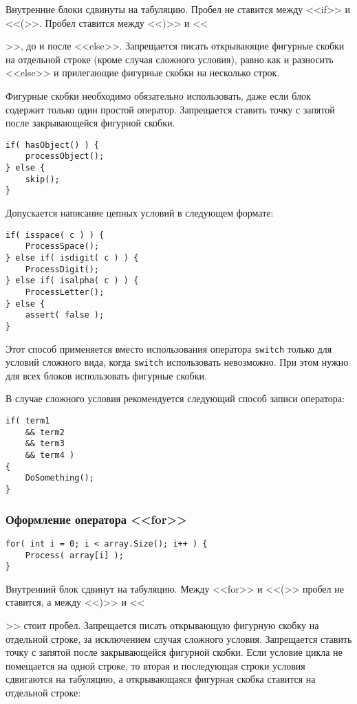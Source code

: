 Внутренние блоки сдвинуты на табуляцию. Пробел не ставится между <<if>> и <<(>>. Пробел ставится между <<)>> и <<{>>, до и после <<else>>. Запрещается писать открывающие фигурные скобки на отдельной строке (кроме случая сложного условия), равно как и разносить <<else>> и прилегающие фигурные скобки на несколько строк.
	
Фигурные скобки необходимо обязательно использовать, даже если блок содержит только один простой оператор. Запрещается ставить точку с запятой после закрывающейся фигурной скобки.

\begin{lstlisting}[frame=single]
if( hasObject() ) {
    processObject();
} else {
    skip();
}
\end{lstlisting}

Допускается написание цепных условий в следующем формате:

\begin{lstlisting}[frame=single]
if( isspace( c ) ) {
    ProcessSpace();
} else if( isdigit( c ) ) {
    ProcessDigit();
} else if( isalpha( c ) ) {
    ProcessLetter();
} else {
    assert( false );
}
\end{lstlisting}

Этот способ применяется  вместо использования оператора \lstinline|switch| только для условий сложного вида, когда \lstinline|switch| использовать невозможно. При этом нужно для всех блоков использовать фигурные скобки.

В случае сложного условия рекомендуется следующий способ записи оператора:

\begin{lstlisting}[frame=single]
if( term1
    && term2
    && term3
    && term4 )
{	
	DoSomething();
}
\end{lstlisting}

\subsubsection{Оформление оператора <<for>>}

\begin{lstlisting}[frame=single]
for( int i = 0; i < array.Size(); i++ ) {
    Process( array[i] );
}
\end{lstlisting}

Внутренний блок сдвинут на табуляцию. Между <<for>> и <<(>> пробел не ставится, а между <<)>> и <<{>> стоит пробел. Запрещается писать открывающую фигурную скобку на отдельной строке, за исключением случая сложного условия. Запрещается ставить точку с запятой после закрывающейся фигурной скобки. Если условие цикла не помещается на одной строке, то вторая и последующая строки условия сдвигаются на табуляцию, а открывающаяся фигурная скобка ставится на отдельной строке:
	
}}
